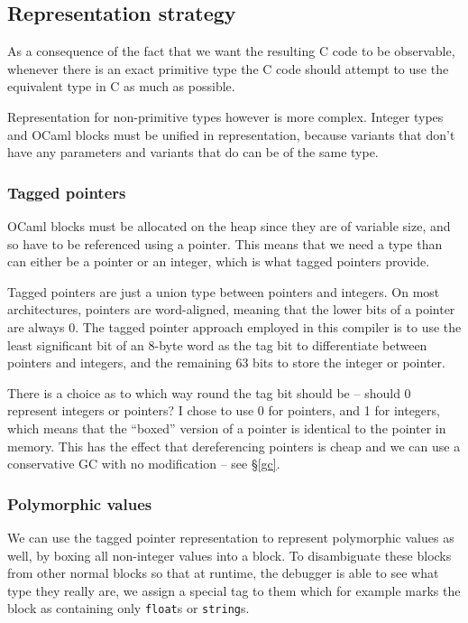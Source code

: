\subsection{Representation strategy}

As a consequence of the fact that we want the resulting C code to be observable,
whenever there is an exact primitive type the C code should attempt to use the
equivalent type in C as much as possible.

Representation for non-primitive types however is more complex. Integer types
and OCaml blocks must be unified in representation, because variants that don't
have any parameters and variants that do can be of the same type.

\subsubsection{Tagged pointers}

OCaml blocks must be allocated on the heap since they are of variable size, and
so have to be referenced using a pointer. This means that we need a type than
can either be a pointer or an integer, which is what tagged pointers provide.

Tagged pointers are just a union type between pointers and integers. On most
architectures, pointers are word-aligned, meaning that the lower bits of a
pointer are always 0. The tagged pointer approach employed in this compiler is
to use the least significant bit of an 8-byte word as the tag bit to
differentiate between pointers and integers, and the remaining 63 bits to store
the integer or pointer.

There is a choice as to which way round the tag bit should be -- should 0 
represent integers or pointers? I chose to use 0 for pointers, and 1 for 
integers, which means that the ``boxed'' version of a pointer is identical to 
the pointer in memory. This has the effect that dereferencing pointers is cheap
and we can use a conservative GC with no modification -- see \S\ref{gc}.

\subsubsection{Polymorphic values}

We can use the tagged pointer representation to represent polymorphic values as
well, by boxing all non-integer values into a block. To disambiguate these
blocks from other normal blocks so that at runtime, the debugger is able to see
what type they really are, we assign a special tag to them which for example
marks the block as containing only \texttt{float}s or \texttt{string}s.

